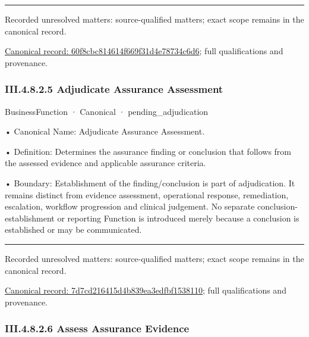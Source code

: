 \medskip\hrule\medskip

{\small Recorded unresolved matters: source-qualified matters; exact scope remains in the canonical record.}\par
{\footnotesize \href{../../../../../../../../continuum/business/business-service/60f8cbc814614f669f31d4e78734c6d6.md}{Canonical record: 60f8cbc814614f669f31d4e78734c6d6}; full qualifications and provenance.}\par
\subsubsection*{III.4.8.2.5 Adjudicate Assurance Assessment}
\label{navigation:III.4.8.2.5}

\label{element:7d7cd216415d4b839ea3edfbf1538110}
{\small BusinessFunction · Canonical · pending\_adjudication}\par

•
Canonical Name: Adjudicate Assurance Assessment.



•
Definition: Determines the assurance finding or conclusion that follows from the assessed evidence and applicable assurance criteria.



•
Boundary: Establishment of the finding/conclusion is part of adjudication. It remains distinct from evidence assessment, operational response, remediation, escalation, workflow progression and clinical judgement. No separate conclusion-establishment or reporting Function is introduced merely because a conclusion is established or may be communicated.



\medskip\hrule\medskip

{\small Recorded unresolved matters: source-qualified matters; exact scope remains in the canonical record.}\par
{\footnotesize \href{../../../../../../../../continuum/business/business-function/7d7cd216415d4b839ea3edfbf1538110.md}{Canonical record: 7d7cd216415d4b839ea3edfbf1538110}; full qualifications and provenance.}\par
\subsubsection*{III.4.8.2.6 Assess Assurance Evidence}
\label{navigation:III.4.8.2.6}

